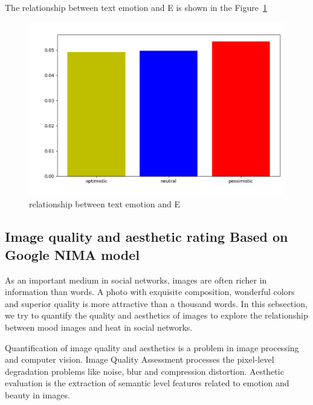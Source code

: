 \documentclass[10pt,twocolumn,letterpaper]{article}
\begin{document}
     The relationship between text emotion and E is shown in the Figure~\ref{fig:e2}
    \begin{figure}[t]
    \begin{center}
    \includegraphics[width=\linewidth]{e2}
    \end{center}
    \vspace{-0.5cm}
       \caption{relationship between text emotion and E}
       \label{fig:e2}
    \end{figure}

\subsection{Image quality and aesthetic rating Based on Google NIMA model}
    As an important medium in social networks, images are often richer in information than words.
    A photo with exquisite composition, wonderful colors and superior quality is more attractive than a thousand words.
    In this sebsection, we try to quantify the quality and aesthetics of images to explore the relationship between mood images and heat in social networks.

    Quantification of image quality and aesthetics is a problem in image processing and computer vision.
    Image Quality Assessment processes the pixel-level degradation problems like noise, blur and compression distortion.
    Aesthetic evaluation is the extraction of semantic level features related to emotion and beauty in images.
\end{document}
